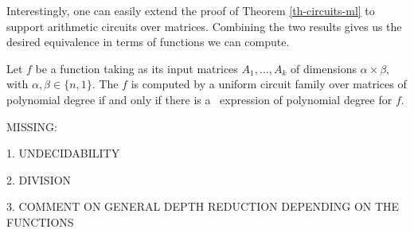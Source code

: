 Interestingly, one can easily extend the proof of Theorem \ref{th-circuits-ml} to support arithmetic circuits over matrices. Combining the two results gives us the desired equivalence in terms of functions we can compute.

\begin{corollary}
\label{th-equivalence}
Let $f$ be a function taking as its input matrices $A_1,\ldots ,A_k$ of dimensions $\alpha\times \beta$, with $\alpha,\beta \in \{n,1\}$. The $f$ is computed by a uniform circuit family over matrices of polynomial degree if and only if there is a \langfor\ expression of polynomial degree for $f$. 
\end{corollary}


MISSING:

1. UNDECIDABILITY

2. DIVISION

3. COMMENT ON GENERAL DEPTH REDUCTION DEPENDING ON THE FUNCTIONS
